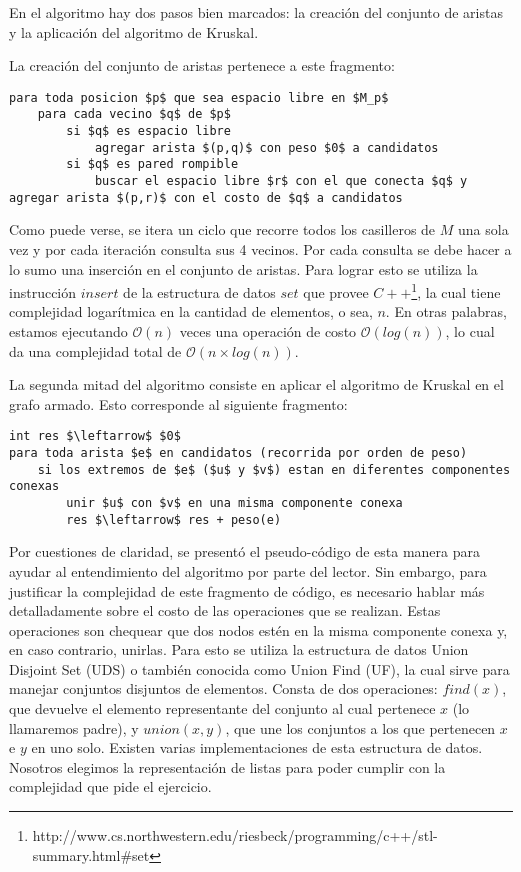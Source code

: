 En el algoritmo hay dos pasos bien marcados: la creación del conjunto de aristas y la aplicación del algoritmo de Kruskal.

La creación del conjunto de aristas pertenece a este fragmento:

\begin{lstlisting}
para toda posicion $p$ que sea espacio libre en $M_p$
	para cada vecino $q$ de $p$
		si $q$ es espacio libre
			agregar arista $(p,q)$ con peso $0$ a candidatos
		si $q$ es pared rompible
			buscar el espacio libre $r$ con el que conecta $q$ y agregar arista $(p,r)$ con el costo de $q$ a candidatos
\end{lstlisting}

Como puede verse, se itera un ciclo que recorre todos los casilleros de $M$ una sola vez y por cada iteración consulta sus 4 vecinos. Por cada consulta se debe hacer a lo sumo una inserción en el conjunto de aristas. Para lograr esto se utiliza la instrucción $insert$ de la estructura de datos $set$ que provee $C++$\footnote{http://www.cs.northwestern.edu/\texttildelow riesbeck/programming/c++/stl-summary.html\#set}, la cual tiene complejidad logarítmica en la cantidad de elementos, o sea, $n$. En otras palabras, estamos ejecutando $\mathcal{O}(n)$ veces una operación de costo $\mathcal{O}(log(n))$, lo cual da una complejidad total de $\mathcal{O}(n \times log(n))$.

La segunda mitad del algoritmo consiste en aplicar el algoritmo de Kruskal en el grafo armado. Esto corresponde al siguiente fragmento:

\begin{lstlisting}
int res $\leftarrow$ $0$
para toda arista $e$ en candidatos (recorrida por orden de peso)
	si los extremos de $e$ ($u$ y $v$) estan en diferentes componentes conexas
		unir $u$ con $v$ en una misma componente conexa
		res $\leftarrow$ res + peso(e)
\end{lstlisting}

Por cuestiones de claridad, se presentó el pseudo-código de esta manera para ayudar al entendimiento del algoritmo por parte del lector. Sin embargo, para justificar la complejidad de este fragmento de código, es necesario hablar más detalladamente sobre el costo de las operaciones que se realizan. Estas operaciones son chequear que dos nodos estén en la misma componente conexa y, en caso contrario, unirlas. Para esto se utiliza la estructura de datos Union Disjoint Set (UDS) o también conocida como Union Find (UF), la cual sirve para manejar conjuntos disjuntos de elementos. Consta de dos operaciones: $find(x)$, que devuelve el elemento representante del conjunto al cual pertenece $x$ (lo llamaremos padre), y $union(x,y)$, que une los conjuntos a los que pertenecen $x$ e $y$ en uno solo. Existen varias implementaciones de esta estructura de datos. Nosotros elegimos la representación de listas para poder cumplir con la complejidad que pide el ejercicio.

